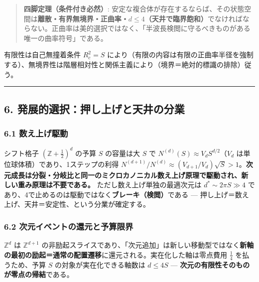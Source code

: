 \documentclass[
]{ltjsarticle}
\begin{document}
\begin{quote}
\textbf{四脚定理（条件付き必然）}:
安定な複合体が存在するならば、その状態空間は\textbf{離散・有界無境界・正曲率・\(d\le4\)（天井で臨界飽和）}でなければならない。正曲率は美的選択ではなく、「半波長検閲に守るべきものがある唯一の曲率符号」である。
\end{quote}

有限性は自己無撞着条件 \(R_c^2=S\)
により（有限の内容は有限の正曲率半径を強制する）、無境界性は階層相対性と関係主義により（境界＝絶対的標識の排除）従う。

\begin{center}\rule{0.5\linewidth}{0.5pt}\end{center}

\subsection{6.
発展的選択：押し上げと天井の分業}\label{ux767aux5c55ux7684ux9078ux629eux62bcux3057ux4e0aux3052ux3068ux5929ux4e95ux306eux5206ux696d}

\subsubsection{6.1
数え上げ駆動}\label{ux6570ux3048ux4e0aux3052ux99c6ux52d5}

シフト格子 \((\mathbb{Z}+\tfrac12)^d\) の予算 \(S\) の容量は大 \(S\) で
\(N^{(d)}(S)\approx V_d S^{d/2}\)（\(V_d\)
は単位球体積）であり、1ステップの利得
\(N^{(d+1)}/N^{(d)}\approx(V_{d+1}/V_d)\sqrt S>1\)。\textbf{次元成長は分裂・分岐比と同一のミクロカノニカル数え上げ原理で駆動され、新しい重み原理は不要である。}
ただし数え上げ単独の最適次元は \(d^\ast\sim2\pi S\gg4\)
であり、4で止めるのは駆動ではなく\textbf{ブレーキ（検閲）}である ---
押し上げ＝数え上げ、天井＝安定性、という分業が確定する。

\subsubsection{6.2
次元イベントの還元と予算限界}\label{ux6b21ux5143ux30a4ux30d9ux30f3ux30c8ux306eux9084ux5143ux3068ux4e88ux7b97ux9650ux754c}

\(\mathbb{Z}^d\) は \(\mathbb{Z}^{d+1}\)
の非励起スライスであり、「次元追加」は新しい移動型ではなく\textbf{新軸の最初の励起＝通常の配置遷移}に還元される。実在化した軸は零点費用
\(\tfrac14\) を払うため、予算 \(S\) の対象が実在化できる軸数は
\(d\le4S\) --- \textbf{次元の有限性そのものが零点の帰結}である。
\end{document}
